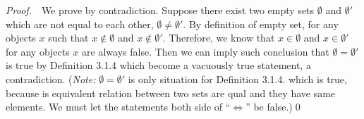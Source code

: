 \documentclass{book}
\newcommand{\pff}{\vspace{.25em}\noindent\emph{Proof.}~~}
\newcounter{Exercise}[section]
\renewcommand{\theExercise}{\thesection.\arabic{Exercise}.}
\newcommand{\new}{\vspace{1.5em}\noindent\textbf{{Exercise \stepcounter{Exercise}\textbf{\theExercise}}} }
\begin{document}
\pff We prove by contradiction. Suppose there exist two empty sets $\emptyset$ and $\emptyset'$ which are not equal to each other, $\emptyset\ne\emptyset'$. By definition of empty set, for any objects $x$ such that $x\notin\emptyset$ and $x\notin\emptyset'$. Therefore, we know that $x\in\emptyset$ and $x\in\emptyset'$ for any objects $x$ are always false. Then we can imply such conclusion that $\emptyset=\emptyset'$ is true by Definition 3.1.4 which become a vacuously true statement, a contradiction. (\emph{Note:} $\emptyset=\emptyset'$ is only situation for Definition 3.1.4. which is true, because is equivalent relation between two sets are qual and they have same elements. We must let the statements both side of ``$\iff$'' be false.)\qed
\begin{comment}
\new\emph{Note that there can only be one empty set; if there were two sets $\emptyset$ and $\emptyset'$ which were both empty, then by Definition 3.1.4 they would be equal to each other (why?, p.36).}

\pff We prove by contradiction. Suppose there exist two empty sets $\emptyset$ and $\emptyset'$ which are not equal to each other, $\emptyset\ne\emptyset'$. By definition of empty set, for any objects $x$ such that $x\notin\emptyset$ and $x\notin\emptyset'$. Therefore, we know that $x\in\emptyset$ and $x\in\emptyset'$ for any objects $x$ are always false. Then we can imply such conclusion that $\emptyset=\emptyset'$ is true by Definition 3.1.4 which become a vacuously true statement, a contradiction. (\emph{Note:} $\emptyset=\emptyset'$ is only situation for Definition 3.1.4. which is true, because is equivalent relation between two sets are qual and they have same elements. We must let the statements both side of ``$\iff$'' be false.)\qed

\new\emph{Just as there is only one empty set, there is only one singleton set for each object $a$, thanks to Definition 3.1.4 (why?).
Similarly, given any two objects $a$ and $b$, there is only one pair set formed by $a$ and $b$. Also, Definition 3.1.4 also ensures that $\{a,b\}=\{b,a\}$ (why?) and $\{a,a\}=\{a\}$ (why?, p.37).}

\pff We prove the first statement by contradiction. Suppose there exist two singleton sets $\{a\}$ and $\{a\}'$ for each object $a$ which are not equal to each other, $\{a\}\ne\{a\}'$. But, by Definition of 3.1.4, the object $a$ is an element of set $\{a\}$ and not in $\{a\}'$, or on the contrary. It is impossible by Axiom 3.3, a contradiction.


\end{comment}
\end{document}
